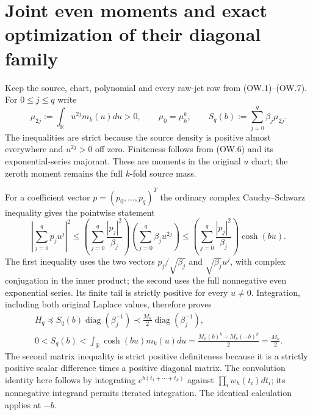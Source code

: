 \documentclass[11pt]{article}
\newcommand{\R}{\mathbb R}
\newcommand{\diag}{\operatorname{diag}}
\begin{document}
\section{Joint even moments and exact optimization of their diagonal family}

Keep the source, chart, polynomial and every raw-jet row from (OW.1)--(OW.7).
For $0\le j\le q$ write
\[
 \mu_{2j}:=\int_\R u^{2j}m_k(u)du>0,\qquad
 \mu_0=\mu_h^k,\qquad
 S_q(b):=\sum_{j=0}^q\beta_j\mu_{2j}.
 \tag{OW.30}
\]
The inequalities are strict because the source density is positive almost
everywhere and $u^{2j}>0$ off zero. Finiteness follows from (OW.6) and its
exponential-series majorant. These are moments in the original $u$ chart;
the zeroth moment remains the full $k$-fold source mass.

For a coefficient vector $p=(p_0,\ldots,p_q)^T$ the ordinary complex
Cauchy--Schwarz inequality gives the pointwise statement
\[
 \left|\sum_{j=0}^qp_ju^j\right|^2
 \le\left(\sum_{j=0}^q\frac{|p_j|^2}{\beta_j}\right)
      \left(\sum_{j=0}^q\beta_j u^{2j}\right)
 \le\left(\sum_{j=0}^q\frac{|p_j|^2}{\beta_j}\right)\cosh(bu).
\]
The first inequality uses the two vectors $p_j/\sqrt{\beta_j}$ and
$\sqrt{\beta_j}u^j$, with complex conjugation in the inner product;
the second uses the full nonnegative even exponential series.
Its finite tail is strictly positive for every $u\ne0$. Integration,
including both original Laplace values, therefore proves
\[
 \begin{gathered}
 H_q\preceq S_q(b)\diag(\beta_j^{-1})
       \prec\frac{M_k}{2}\diag(\beta_j^{-1}),\\
 0<S_q(b)<\int_\R\cosh(bu)m_k(u)du
   =\frac{M_h(b)^k+M_h(-b)^k}{2}=\frac{M_k}{2}.
 \end{gathered}                                                \tag{OW.31}
\]
The second matrix inequality is strict positive definiteness because it
is a strictly positive scalar difference times a positive diagonal matrix.
The convolution identity here follows by integrating $e^{b(t_1+\cdots+t_k)}$
against $\prod_iw_h(t_i)dt_i$; its nonnegative integrand permits iterated
integration. The identical calculation applies at $-b$.
\end{document}
